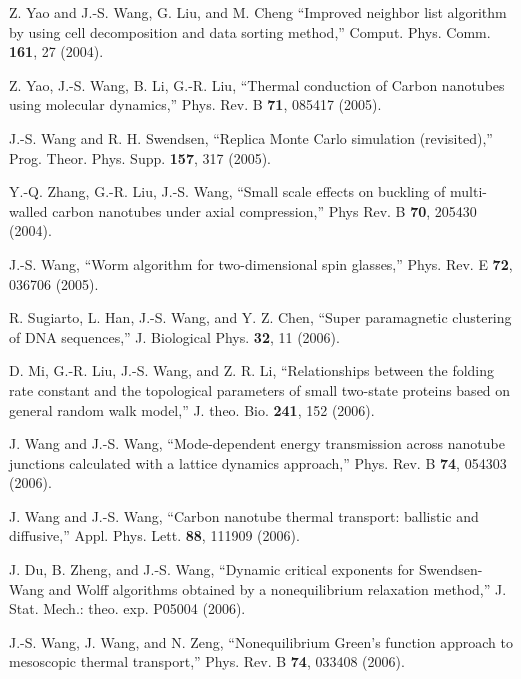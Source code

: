 \itm Z. Yao and J.-S. Wang, G. Liu, and M. Cheng ``Improved neighbor list 
algorithm by using cell decomposition and data sorting method,'' 
Comput. Phys. Comm. {\bf 161}, 27 (2004). 

\itm Z. Yao, J.-S. Wang, B. Li, G.-R. Liu, ``Thermal conduction of Carbon 
nanotubes using molecular dynamics,'' Phys. Rev. B {\bf 71}, 085417 (2005). 

\itm J.-S. Wang and R. H. Swendsen, ``Replica Monte Carlo simulation (revisited),'' 
Prog. Theor. Phys. Supp. {\bf 157}, 317 (2005). 

\itm Y.-Q. Zhang, G.-R. Liu, J.-S. Wang, ``Small scale effects on buckling 
of multi-walled carbon nanotubes under axial compression,'' 
Phys Rev. B {\bf 70}, 205430 (2004).

\itm J.-S. Wang, ``Worm algorithm for two-dimensional spin glasses,'' Phys. Rev. E {\bf 72}, 036706 (2005).

\itm R. Sugiarto, L. Han, J.-S. Wang, and Y. Z. Chen, ``Super paramagnetic 
clustering of DNA sequences,'' J. Biological Phys. 
{\bf 32}, 11 (2006).

\itm D. Mi, G.-R. Liu, J.-S. Wang, and Z. R. Li, ``Relationships between the 
folding rate constant and the topological parameters of small two-state 
proteins based on general random walk model,'' 
J. theo. Bio. {\bf 241}, 152 (2006).


\itm J. Wang and J.-S. Wang, ``Mode-dependent energy transmission across 
nanotube junctions calculated with a lattice dynamics approach,''
Phys. Rev. B {\bf 74}, 054303 (2006).

\itm J. Wang and J.-S. Wang, ``Carbon nanotube thermal transport: ballistic 
and diffusive,''  Appl. Phys. Lett.  {\bf 88}, 111909 (2006).

\itm J. Du, B. Zheng, and J.-S. Wang, ``Dynamic critical exponents for
Swendsen-Wang and Wolff algorithms obtained by a nonequilibrium relaxation 
method,'' J. Stat. Mech.: theo. exp. P05004 (2006).

\itm J.-S. Wang, J. Wang, and N. Zeng, ``Nonequilibrium Green's function
approach to mesoscopic thermal transport,'' Phys. Rev. B {\bf 74}, 033408 (2006). 


